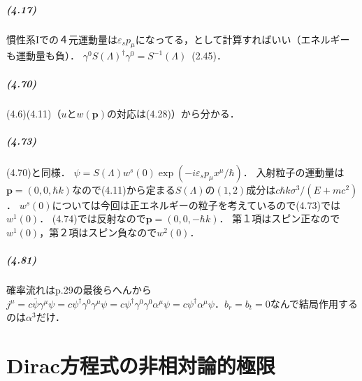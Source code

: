 \paragraph{(4.17)}
慣性系Iでの４元運動量は$\varepsilon_sp_\mu$になってる，として計算すればいい（エネルギーも運動量も負）．
$\gamma^0 S(\Lambda)^\dagger \gamma^0 = S^{ - 1}(\Lambda)$~(2.45)．

\paragraph{(4.70)}
(4.6)(4.11)（$u$と$w(\boldsymbol{p})$の対応は(4.28)）から分かる．

\paragraph{(4.73)}
(4.70)と同様．
$\psi=S(\Lambda)w^s(0)\exp( - i\varepsilon_sp_\mu x^\mu/\hbar)$．
入射粒子の運動量は$\boldsymbol{p}=(0,0,\hbar k)$なので(4.11)から定まる$S(\Lambda)$の$(1,2)$成分は$c\hbar k\sigma^3/(E + mc^2)$．
$w^s(0)$については今回は正エネルギーの粒子を考えているので(4.73)では$w^1(0)$．
(4.74)では反射なので$\boldsymbol{p}=(0,0, - \hbar k)$．
第１項はスピン正なので$w^1(0)$，第２項はスピン負なので$w^2(0)$．

\paragraph{(4.81)}
確率流れはp.29の最後らへんから$j^\mu=c\bar{\psi}\gamma^\mu\psi=c\psi^\dagger\gamma^0\gamma^\mu\psi=c\psi^\dagger\gamma^0\gamma^0\alpha^\mu\psi=c\psi^\dagger\alpha^\mu\psi$．$b_r=b_t=0$なんで結局作用するのは$\alpha^3$だけ．

\chapter{Dirac方程式の非相対論的極限}
